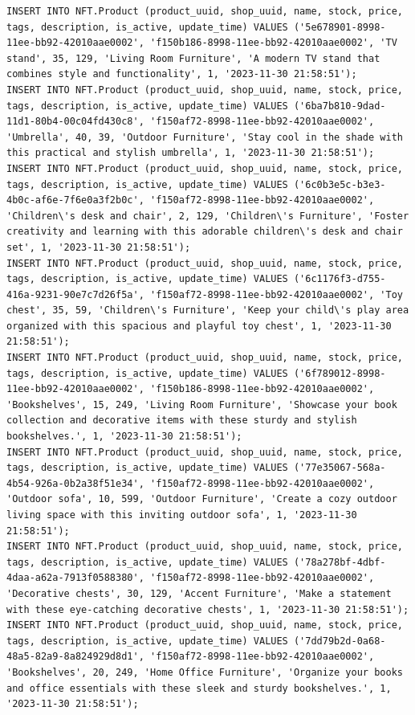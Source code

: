 \documentclass[a4paper, 12pt]{article}
\begin{document}
\begin{lstlisting}
INSERT INTO NFT.Product (product_uuid, shop_uuid, name, stock, price, tags, description, is_active, update_time) VALUES ('5e678901-8998-11ee-bb92-42010aae0002', 'f150b186-8998-11ee-bb92-42010aae0002', 'TV stand', 35, 129, 'Living Room Furniture', 'A modern TV stand that combines style and functionality', 1, '2023-11-30 21:58:51');
INSERT INTO NFT.Product (product_uuid, shop_uuid, name, stock, price, tags, description, is_active, update_time) VALUES ('6ba7b810-9dad-11d1-80b4-00c04fd430c8', 'f150af72-8998-11ee-bb92-42010aae0002', 'Umbrella', 40, 39, 'Outdoor Furniture', 'Stay cool in the shade with this practical and stylish umbrella', 1, '2023-11-30 21:58:51');
INSERT INTO NFT.Product (product_uuid, shop_uuid, name, stock, price, tags, description, is_active, update_time) VALUES ('6c0b3e5c-b3e3-4b0c-af6e-7f6e0a3f2b0c', 'f150af72-8998-11ee-bb92-42010aae0002', 'Children\'s desk and chair', 2, 129, 'Children\'s Furniture', 'Foster creativity and learning with this adorable children\'s desk and chair set', 1, '2023-11-30 21:58:51');
INSERT INTO NFT.Product (product_uuid, shop_uuid, name, stock, price, tags, description, is_active, update_time) VALUES ('6c1176f3-d755-416a-9231-90e7c7d26f5a', 'f150af72-8998-11ee-bb92-42010aae0002', 'Toy chest', 35, 59, 'Children\'s Furniture', 'Keep your child\'s play area organized with this spacious and playful toy chest', 1, '2023-11-30 21:58:51');
INSERT INTO NFT.Product (product_uuid, shop_uuid, name, stock, price, tags, description, is_active, update_time) VALUES ('6f789012-8998-11ee-bb92-42010aae0002', 'f150b186-8998-11ee-bb92-42010aae0002', 'Bookshelves', 15, 249, 'Living Room Furniture', 'Showcase your book collection and decorative items with these sturdy and stylish bookshelves.', 1, '2023-11-30 21:58:51');
INSERT INTO NFT.Product (product_uuid, shop_uuid, name, stock, price, tags, description, is_active, update_time) VALUES ('77e35067-568a-4b54-926a-0b2a38f51e34', 'f150af72-8998-11ee-bb92-42010aae0002', 'Outdoor sofa', 10, 599, 'Outdoor Furniture', 'Create a cozy outdoor living space with this inviting outdoor sofa', 1, '2023-11-30 21:58:51');
INSERT INTO NFT.Product (product_uuid, shop_uuid, name, stock, price, tags, description, is_active, update_time) VALUES ('78a278bf-4dbf-4daa-a62a-7913f0588380', 'f150af72-8998-11ee-bb92-42010aae0002', 'Decorative chests', 30, 129, 'Accent Furniture', 'Make a statement with these eye-catching decorative chests', 1, '2023-11-30 21:58:51');
INSERT INTO NFT.Product (product_uuid, shop_uuid, name, stock, price, tags, description, is_active, update_time) VALUES ('7dd79b2d-0a68-48a5-82a9-8a824929d8d1', 'f150af72-8998-11ee-bb92-42010aae0002', 'Bookshelves', 20, 249, 'Home Office Furniture', 'Organize your books and office essentials with these sleek and sturdy bookshelves.', 1, '2023-11-30 21:58:51');

\end{lstlisting}
\end{document}
